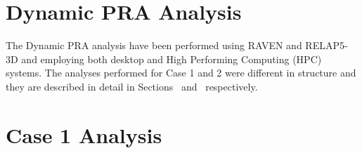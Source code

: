 \section{Dynamic PRA Analysis}
\label{sec:RISMCanalysis}

The Dynamic PRA analysis have been performed using RAVEN and RELAP5-3D and employing 
both desktop and High Performing Computing (HPC) systems. The analyses performed for 
Case 1 and 2 were different in structure and they are described in detail in 
Sections~\label{sec:RISMC_1_analysis} and~\label{sec:RISMC_2_analysis} respectively.


\section{Case 1 Analysis}
\label{sec:RISMC_1_analysis}


